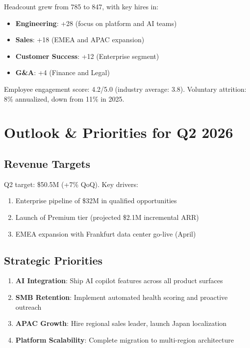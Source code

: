 \documentclass[11pt,a4paper]{article}
\begin{document}
Headcount grew from 785 to 847, with key hires in:

\begin{itemize}
    \item \textbf{Engineering}: +28 (focus on platform and AI teams)
    \item \textbf{Sales}: +18 (EMEA and APAC expansion)
    \item \textbf{Customer Success}: +12 (Enterprise segment)
    \item \textbf{G\&A}: +4 (Finance and Legal)
\end{itemize}

Employee engagement score: 4.2/5.0 (industry average: 3.8). Voluntary attrition: 8\% annualized, down from 11\% in 2025.

\section{Outlook \& Priorities for Q2 2026}
\label{sec:outlook}

\subsection{Revenue Targets}

Q2 target: \$50.5M (+7\% QoQ). Key drivers:

\begin{enumerate}
    \item Enterprise pipeline of \$32M in qualified opportunities
    \item Launch of Premium tier (projected \$2.1M incremental ARR)
    \item EMEA expansion with Frankfurt data center go-live (April)
\end{enumerate}

\subsection{Strategic Priorities}

\begin{enumerate}
    \item \textbf{AI Integration}: Ship AI copilot features across all product surfaces
    \item \textbf{SMB Retention}: Implement automated health scoring and proactive outreach
    \item \textbf{APAC Growth}: Hire regional sales leader, launch Japan localization
    \item \textbf{Platform Scalability}: Complete migration to multi-region architecture
\end{enumerate}
\end{document}

